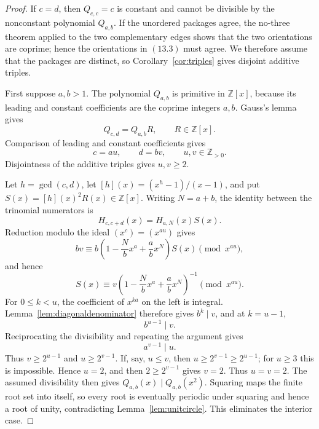 \documentclass[11pt]{article}
\theoremstyle{definition}
\newcommand{\Z}{\mathbb Z}
\begin{document}
\begin{proof}
If \(c=d\), then \(Q_{c,c}=c\) is constant and cannot be divisible by the
nonconstant polynomial \(Q_{a,b}\).  If the unordered packages agree, the
no-three theorem applied to the two
complementary edges shows that the two orientations are coprime; hence the
orientations in \((13.3)\) must agree.  We therefore assume that the packages
are distinct, so Corollary~\ref{cor:triples} gives disjoint additive triples.

First suppose \(a,b>1\).  The polynomial \(Q_{a,b}\) is primitive in
\(\Z[x]\), because its leading and constant coefficients are the coprime
integers \(a,b\).  Gauss's lemma gives
\[
 Q_{c,d}=Q_{a,b}R,\qquad R\in\Z[x].
\]
Comparison of leading and constant coefficients gives
\begin{equation}
 c=au,\qquad d=bv,\qquad u,v\in\Z_{>0}.
 \tag{13.4}
\end{equation}
Disjointness of the additive triples gives \(u,v\geq2\).

Let \(h=\gcd(c,d)\), let \([h](x)=(x^h-1)/(x-1)\), and put
\(S(x)=[h](x)^2R(x)\in\Z[x]\).  Writing \(N=a+b\), the identity between
the trinomial numerators is
\[
 H_{c,c+d}(x)=H_{a,N}(x)S(x).
\]
Reduction modulo the ideal \((x^{c})=(x^{au})\) gives
\[
 b v\equiv
 b\left(1-\frac Nb x^a+\frac ab x^N\right)S(x)
 \pmod{x^{au}},
\]
and hence
\begin{equation}
 S(x)\equiv
 v\left(1-\frac Nb x^a+\frac ab x^N\right)^{-1}
 \pmod{x^{au}}.
 \tag{13.5}
\end{equation}
For \(0\leq k<u\), the coefficient of \(x^{ka}\) on the left is integral.
Lemma~\ref{lem:diagonaldenominator} therefore gives \(b^k\mid v\), and at
\(k=u-1\),
\begin{equation}
 b^{u-1}\mid v.
 \tag{13.6}
\end{equation}
Reciprocating the divisibility and repeating the argument gives
\begin{equation}
 a^{v-1}\mid u.
 \tag{13.7}
\end{equation}
Thus \(v\geq2^{u-1}\) and \(u\geq2^{v-1}\).  If, say,
\(u\leq v\), then \(u\geq2^{v-1}\geq2^{u-1}\); for \(u\geq3\) this is
impossible.  Hence \(u=2\), and then \(2\geq2^{v-1}\) gives \(v=2\).
Thus \(u=v=2\).  The
assumed divisibility then gives
\(Q_{a,b}(x)\mid Q_{a,b}(x^2)\).  Squaring maps the finite root set into
itself, so every root is eventually periodic under squaring and hence a root
of unity, contradicting Lemma~\ref{lem:unitcircle}.  This eliminates the
interior case.


\end{proof}
\end{document}
